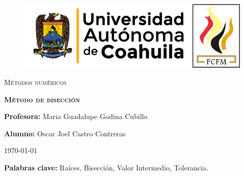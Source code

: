 \documentclass[12pt]{article}
\begin{document}
		
		\begin{titlepage}
		
			\centering
			{\bfseries
			\begin{figure}[h!]
				\centering
				\includegraphics[width=\linewidth]{Nom_UAdeC_FCFM.png} 				
			\end{figure}
			\par}
			\vspace{2cm}
			{\scshape\LARGE Métodos numéricos \par}
			\vspace{3cm}
			{\scshape\Huge \textbf{Método de bisección} \par}
			\vfill
			{\LARGE \textbf{Profesora:} Maria Guadalupe Godina Cubillo \par}
			\vspace{3cm}
			{\LARGE \textbf{Alumno:} Oscar Joel Castro Contreras \par}
			\vfill
			{\Large \today \par}
			\thispagestyle{empty}
			
		\end{titlepage}
	
		\newpage

		\begin{abstract}
			\noindent En este reporte explico un poco de los métodos que existen para encontrar las raíces de cualquier 
			polinomio o función que tenga raíces, y en específico explico, qué es, en que consiste y cuales son las 
			limitaciones del método de bisección para encontrar raíces.
		\end{abstract}

		\textbf{Palabras clave:} Raíces, Bisección, Valor Intermedio, Tolerancia.
\end{document}
